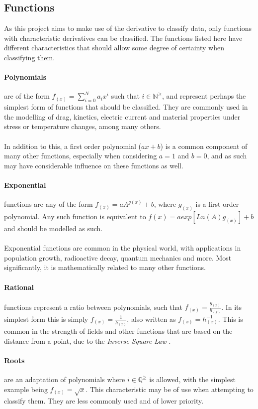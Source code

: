 \documentclass[main.tex]{subfiles}
\begin{document}
    \subsection{Functions}
      
      As this project aims to make use of the derivative to classify data, only functions with characteristic derivatives can be classified. The functions listed here have different characteristics that should allow some degree of certainty when classifying them.
      \paragraph{Polynomials} are of the form $f_{(x)}=\sum_{i=0}^{N} a_i x^i$ such that $i \in \mathbb{N}^\geq$, and represent perhaps the simplest form of functions that should be classified. They are commonly used in the modelling of drag, kinetics, electric current and material properties under stress or temperature changes, among many others. 
      \\\\
      In addition to this, a first order polynomial ($a x + b$) is a common component of many other functions, especially when considering $a=1$ and $b=0$, and as such may have considerable influence on these functions as well.
      \paragraph{Exponential} functions are any of the form $f_{(x)}= a A^{g(x)} + b$, where $g_{(x)}$ is a first order polynomial. Any such function is equivalent to $ f{(x)} =  a exp[  Ln(A) g_{(x)}  ] +b $ and should be modelled as such. 
      \\\\
      Exponential functions are common in the physical world, with applications in population growth, radioactive decay, quantum mechanics and more. Most significantly, it is mathematically related to many other functions.
      \paragraph{Rational} functions represent a ratio between polynomials, such that $f_{(x)}=\frac{g_{(x)}}{h_{(x)}}$. In its simplest form this is simply $f_{(x)}=\frac{1}{h_{(x)}}$, also written as $f_{(x)}=h_{(x)}^{-1}$. This is common in the strength of fields and other functions that are based on the distance from a point, due to the \textit{Inverse Square Law} \cite{}. 
      \paragraph{Roots} are an adaptation of polynomials where $i \in \mathbb{Q}^\geq$ is allowed, with the simplest example being $f_{(x)}=\sqrt{x}$. This characteristic may be of use when attempting to classify them. They are less commonly used and of lower priority.
\end{document}
